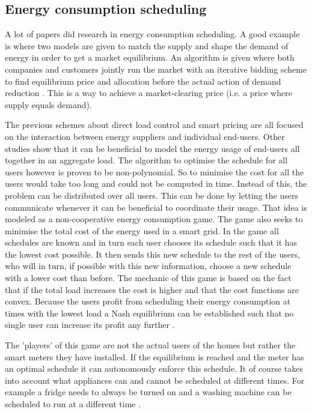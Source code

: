 \subsection{Energy consumption scheduling}
A lot of papers did research in energy consumption scheduling. A good example is \cite{ChenLiLowEtAl2010} where two models are given to match the supply and shape the demand of energy in order to get a market equilibrium. An algorithm is given where both companies and customers jointly run the market with an iterative bidding scheme to find equilibrium price and allocation before the actual action of demand reduction \cite{ChenLiLowEtAl2010}. This is a way to achieve a market-clearing price (i.e. a price where supply equals demand).

The previous schemes about direct load control and smart pricing are all focused on the interaction between energy suppliers and individual end-users. Other studies show \cite{Mohsenian-RadWongJatskevichEtAl2010a, SalinasLiLi2013} that it can be beneficial to model the energy usage of end-users all together in an aggregate load. The algorithm to optimise the schedule for all users however is proven to be non-polynomial. \cite{CaronKesidis2010} So to minimise the cost for all the users would take too long and could not be computed in time. Instead of this, the problem can be distributed over all users. This can be done by letting the users communicate whenever it can be beneficial to coordinate their usage. That idea is modeled as a non-cooperative energy consumption game. The game also seeks to minimise the total cost of the energy used in a smart grid. In the game all schedules are known and in turn each user chooses its schedule such that it has the lowest cost possible. It then sends this new schedule to the rest of the users, who will in turn, if possible with this new information, choose a new schedule with a lower cost than before. The mechanic of this game is based on the fact that if the total load increases the cost is higher and that the cost functions are convex. Because the users profit from scheduling their energy consumption at times with the lowest load a Nash equilibrium can be established such that no single user can increase its profit any further  \cite{Mohsenian-RadWongJatskevichEtAl2010a}.

The 'players' of this game are not the actual users of the homes but rather the smart meters they have installed. If the equilibrium is reached and the meter has an optimal schedule it can autonomously enforce this schedule. It of course takes into account what appliances can and cannot be scheduled at different times. For example a fridge needs to always be turned on and a washing machine can be scheduled to run at a different time \cite{DepuruWangDevabhaktuni2011a}. 
